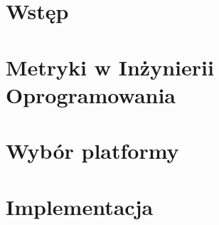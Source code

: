 \chapter*{Wstęp}
\thispagestyle{empty}




\chapter{Metryki w Inżynierii Oprogramowania}
\setcounter{page}{1}




\chapter{Wybór platformy}

\chapter{Implementacja}

